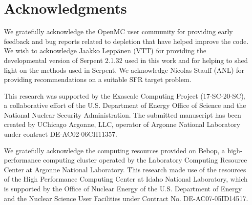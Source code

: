 \documentclass[3p,authoryear]{elsarticle}
\begin{document}
\section*{Acknowledgments}

We gratefully acknowledge the OpenMC user community for providing early feedback
and bug reports related to depletion that have helped improve the code. We wish
to acknowledge Jaakko Lepp{\"{a}}nen (VTT) for providing the developmental
version of Serpent 2.1.32 used in this work and for helping to shed light on the
methods used in Serpent. We acknowledge Nicolas Stauff (ANL) for providing
recommendations on a suitable SFR target problem.

This research was supported by the Exascale Computing Project (17-SC-20-SC), a
collaborative effort of the U.S. Department of Energy Office of Science and the
National Nuclear Security Administration. The submitted manuscript has been
created by UChicago Argonne, LLC, operator of Argonne National Laboratory under
contract DE-AC02-06CH11357.

We gratefully acknowledge the computing resources provided on Bebop, a
high-performance computing cluster operated by the Laboratory Computing Resource
Center at Argonne National Laboratory. This research made use of the resources
of the High Performance Computing Center at Idaho National Laboratory, which is
supported by the Office of Nuclear Energy of the U.S. Department of Energy and
the Nuclear Science User Facilities under Contract No. DE-AC07-05ID14517.





\clearpage
\vspace*{\fill}
\noindent{}
\vspace*{\fill}
\end{document}
